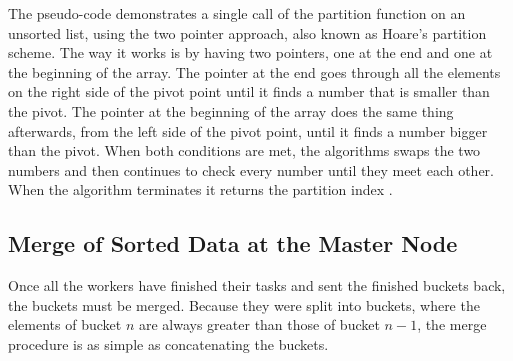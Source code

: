 The pseudo-code demonstrates a single call of the partition function on an unsorted list, using the two pointer approach, also known as Hoare's partition scheme. The way it works is by having two pointers, one at the end and one at the beginning of the array. The pointer at the end goes through all the elements on the right side of the pivot point until it finds a number that is smaller than the pivot. The pointer at the beginning of the array does the same thing afterwards, from the left side of the pivot point, until it finds a number bigger than the pivot. When both conditions are met, the algorithms swaps the two numbers and then continues to check every number until they meet each other. When the algorithm terminates it returns the partition index \cite{hoare-partition}.

\subsection{Merge of Sorted Data at the Master Node}
Once all the workers have finished their tasks and sent the finished buckets back, the buckets must be merged. Because they were split into buckets, where the elements of bucket $n$ are always greater than those of bucket $n-1$, the merge procedure is as simple as concatenating the buckets. 